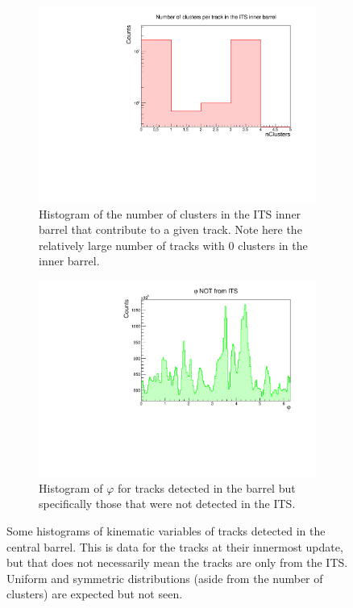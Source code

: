 \begin{figure}[h]
    \begin{subfigure}[t]{.49\linewidth}
        \centering
        \includegraphics[width=\linewidth]{Plots/pass4_TracksIU_nohasITS/itsNClsInnerBarrel.pdf}
        \caption{Histogram of the number of clusters in the ITS inner barrel that contribute to a given track. Note here the relatively large number of tracks with 0 clusters in the inner barrel.}
        \label{fig:nohasITS_NCls_InnerBarrel}
    \end{subfigure}
    \hfill 
    \begin{subfigure}[t]{.49\linewidth}
        \centering
        \includegraphics[width=\linewidth]{Plots/phi_no_ITS.pdf}
        \caption{Histogram of $\varphi$ for tracks detected in the barrel but specifically those that were not detected in the ITS.}
        \label{fig:nohasITS_phi_no_ITS}
    \end{subfigure}
\caption{Some histograms of kinematic variables of tracks detected in the central barrel. This is data for the tracks at their innermost update, but that does not necessarily mean the tracks are only from the ITS. Uniform and symmetric distributions (aside from the number of clusters) are expected but not seen.}
\label{fig:ITS_1D_nohasITS}
\end{figure}

